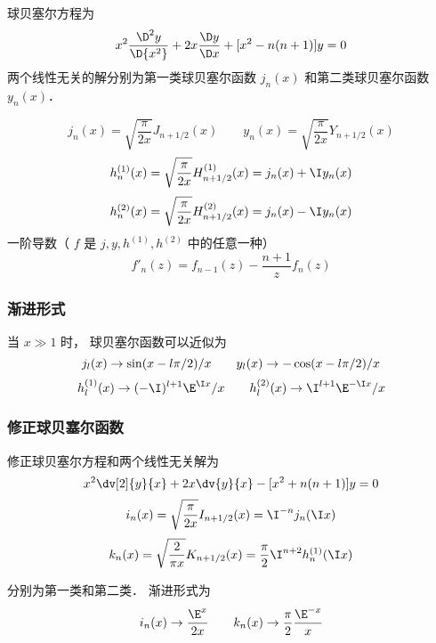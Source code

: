 

球贝塞尔方程为
 \begin{equation}
{x^2}\frac{{{\D ^2}y}}{{\D {x^2}}} + 2x\frac{{\D y}}{{\D x}} + [{x^2} - n(n + 1)]y = 0
\end{equation}
两个线性无关的解分别为第一类球贝塞尔函数 ${j_n}(x)$ 和第二类球贝塞尔函数 ${y_n}(x)$．  

 \begin{equation}
{j_n}(x) = \sqrt {\frac{\pi }{{2x}}} {J_{n + 1/2}}(x)
\qquad
{y_n}(x) = \sqrt {\frac{\pi }{{2x}}} {Y_{n + 1/2}}(x)
\end{equation}
 \begin{equation}
h_n^{(1)}(x) = \sqrt {\frac{\pi }{{2x}}} H_{n + 1/2}^{(1)}(x) = {j_n}(x) + \I y_n(x)
\end{equation}
 \begin{equation}
h_n^{(2)}(x) = \sqrt {\frac{\pi }{{2x}}} H_{n + 1/2}^{(2)}(x) = {j_n}(x) - \I y_n(x)
\end{equation}
一阶导数（ $f$ 是 $j,y,{h^{(1)}},{h^{(2)}}$ 中的任意一种）
\begin{equation}
{f'_n}(z) = {f_{n - 1}}(z) - \frac{{n + 1}}{z}{f_n}(z)
\end{equation}

\subsubsection{渐进形式}
当 $x \gg 1$ 时， 球贝塞尔函数可以近似为
 \begin{equation}
{j_l}(x) \to \sin (x - l\pi /2)/x
\qquad
{y_l}(x{\rm{)}} \to  - \cos (x - l\pi /2)/x
\end{equation}
 \begin{equation}
h_l^{(1)}(x) \to {( -\I)^{l + 1}}{\E^{\I x}}/x
\qquad
h_l^{(2)}(x) \to {\I^{l + 1}}{\E^{ - \I x}}/x
\end{equation}
    

\subsubsection{修正球贝塞尔函数}

修正球贝塞尔方程和两个线性无关解为
 \begin{equation}
 {x^2}\dv[2]{y}{x} + 2x\dv{y}{x} - [x^2 + n(n + 1)]y = 0
\end{equation}
 \begin{equation}
 {i_n}(x) = \sqrt {\frac{\pi }{{2x}}} {I_{n + 1/2}}(x) = {\I^{ - n}}{j_n}(\I x)
 \end{equation}
 \begin{equation}
{k_n}(x) = \sqrt {\frac{2}{{\pi x}}} {K_{n + 1/2}}(x) = \frac{\pi }{2}{\I^{n + 2}}h_n^{(1)}(\I x)
\end{equation}


分别为第一类和第二类． 渐进形式为
  \begin{equation}
{i_n}(x) \to \frac{{{\E^x}}}{{2x}}
\qquad
{k_n}(x) \to \frac{\pi }{2}\frac{{{\E^{ - x}}}}{x}
\end{equation}
